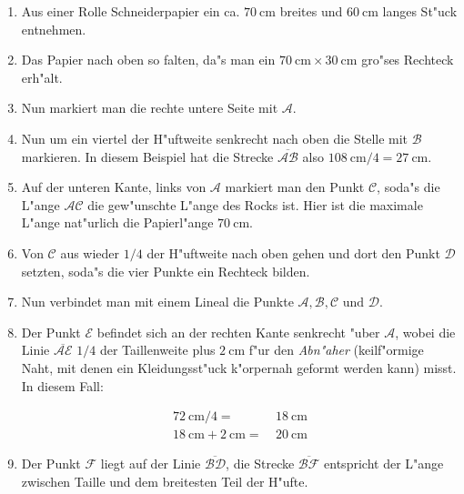 \documentclass{scrartcl}
\begin{document}
\begin{enumerate}
  \item Aus einer Rolle Schneiderpapier ein ca. $\SI{70}{\centi\meter}$ breites
    und $\SI{60}{\centi\meter}$ langes St"uck entnehmen.

  \item Das Papier nach oben so falten, da"s man ein $\SI{70}{\centi\meter}\times
    \SI{30}{\centi\meter}$ gro"ses Rechteck erh"alt.
 
  \item Nun markiert man die rechte untere Seite mit $\mathcal{A}$.
 
  \item Nun um ein viertel der H"uftweite senkrecht nach oben die Stelle mit 
    $\mathcal{B}$ markieren. In diesem Beispiel hat die Strecke
    $\overline{\mathcal{AB}}$ also $\SI{108}{\centi\meter}/4 = 
    \SI{27}{\centi\meter}$.
 
  \item Auf der unteren Kante, links von $\mathcal{A}$ markiert man den Punkt
    $\mathcal{C}$, soda"s die L"ange $\mathcal{AC}$ die gew"unschte L"ange des 
    Rocks ist. Hier ist die maximale L"ange nat"urlich die Papierl"ange
    $\SI{70}{\centi\meter}$.
  
  \item Von $\mathcal{C}$ aus wieder $1/4$ der H"uftweite nach oben gehen und
    dort den Punkt $\mathcal{D}$ setzten, soda"s die vier Punkte ein Rechteck
    bilden.
  
  \item Nun verbindet man mit einem Lineal die Punkte 
    $\mathcal{A,B,C} \text{ und } \mathcal{D}$.
  
  \item Der Punkt $\mathcal{E}$ befindet sich an der rechten Kante senkrecht
    "uber $\mathcal{A}$, wobei die Linie $\overline{\mathcal{AE}}$ $1/4$ 
    der Taillenweite  plus $\SI{2}{\centi\meter}$ f"ur den \emph{Abn"aher}
    (keilf"ormige Naht,
    mit  denen ein Kleidungsst"uck k"orpernah geformt werden kann) misst. In 
    diesem Fall:%

      \begin{align*}
	\SI{72}{\centi\meter}/4=&~\SI{18}{\centi\meter} \\
	\SI{18}{\centi\meter}+\SI{2}{\centi\meter}=&~\SI{20}{\centi\meter}
	\label{abnaeher}
      \end{align*}

  \item Der Punkt $\mathcal{F}$ liegt auf der Linie $\overline{\mathcal{BD}}$,   
	die Strecke $\overline{\mathcal{BF}}$ entspricht der L"ange zwischen
    	Taille und dem breitesten Teil der H"ufte.


\end{enumerate}
\end{document}

